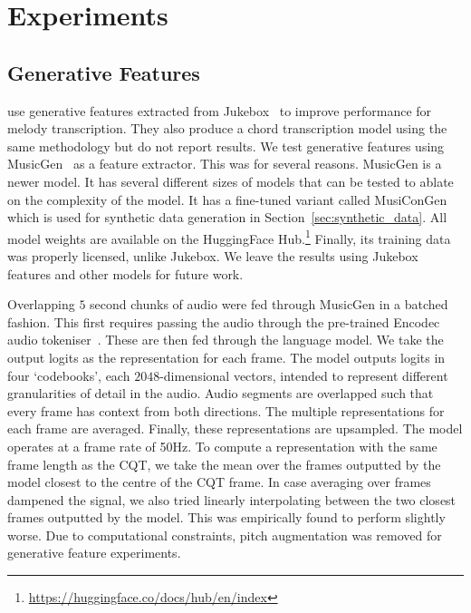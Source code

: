\section{Experiments}\label{sec:experiments}

\subsection{Generative Features}\label{sec:generative_features}

\cite{MelodyTranscriptionViaGenerativePreTraining} use generative features extracted from Jukebox~\cite{Jukebox} to improve performance for melody transcription. They also produce a chord transcription model using the same methodology but do not report results. We test generative features using MusicGen~\cite{MusicGen} as a feature extractor. This was for several reasons. MusicGen is a newer model. It has several different sizes of models that can be tested to ablate on the complexity of the model. It has a fine-tuned variant called MusiConGen~\cite{MusiConGen} which is used for synthetic data generation in Section~\ref{sec:synthetic_data}. All model weights are available on the HuggingFace Hub.\footnote{\url{https://huggingface.co/docs/hub/en/index}} Finally, its training data was properly licensed, unlike Jukebox. We leave the results using Jukebox features and other models for future work. 

Overlapping $5$ second chunks of audio were fed through MusicGen in a batched fashion. This first requires passing the audio through the pre-trained Encodec audio tokeniser~\cite{Encodec}. These are then fed through the language model. We take the output logits as the representation for each frame. The model outputs logits in four `codebooks', each $2048$-dimensional vectors, intended to represent different granularities of detail in the audio. Audio segments are overlapped such that every frame has context from both directions. The multiple representations for each frame are averaged. Finally, these representations are upsampled. The model operates at a frame rate of 50Hz. To compute a representation with the same frame length as the CQT, we take the mean over the frames outputted by the model closest to the centre of the CQT frame. In case averaging over frames dampened the signal, we also tried linearly interpolating between the two closest frames outputted by the model. This was empirically found to perform slightly worse. Due to computational constraints, pitch augmentation was removed for generative feature experiments.

